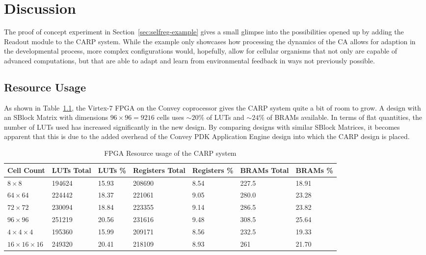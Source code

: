 \chapter{Discussion}

The proof of concept experiment in Section~\ref{sec:selfreg-example} gives a
small glimpse into the possibilities opened up by adding the Readout module
to the CARP system. While the example only showcases how processing the dynamics
of the CA allows for adaption in the developmental process, more complex
configurations would, hopefully, allow for cellular organisms that not only are
capable of advanced computations, but that are able to adapt and learn from
environmental feedback in ways not previously possible.

\section{Resource Usage}

As shown in Table~\ref{tbl:resource-usage}, the Virtex-7 FPGA on the Convey
coprocessor gives the CARP system quite a bit of room to grow. A design with an
SBlock Matrix with dimensions $96\times96 = 9216$ cells uses $\sim 20\%$ of LUTs
and $\sim 24\%$ of BRAMs available. In terms of flat quantities, the number
of LUTs used has increased significantly in the new design. By comparing designs
with similar SBlock Matrices, it becomes apparent that this is due to the added
overhead of the Convey PDK Application Engine design into which the CARP design
is placed.


\renewcommand{\arraystretch}{1.2}
\begin{table}[ht]
  \centering
  \begin{tabularx}{\linewidth}{X|X|X|X|X|X|X}
    Cell Count & LUTs Total & LUTs \% & Registers Total & Registers \% & BRAMs Total & BRAMs \%\\
    \hline
    $8\times8$ & 194624 & 15.93 & 208690 & 8.54 & 227.5 & 18.91\\ 
    \hline
    $64\times64$ & 224442 & 18.37 & 221061 & 9.05 & 280.0 & 23.28\\
    \hline
    $72\times72$ & 230094 & 18.84 & 223355 & 9.14 & 286.5 & 23.82\\
    \hline
    $96\times96$ & 251219 & 20.56 & 231616 & 9.48 & 308.5 & 25.64\\
    \hline
    $4\times4\times4$ & 195360 & 15.99 & 209171 & 8.56 & 232.5 & 19.33\\
    \hline
    $16\times16\times16$ & 249320 & 20.41 & 218109 & 8.93 & 261 & 21.70\\
  \end{tabularx}
  \caption{FPGA Resource usage of the CARP system}\label{tbl:resource-usage}
\end{table}

